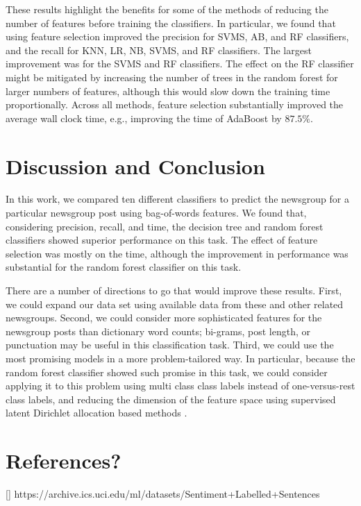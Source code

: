 \documentclass{article} %
\begin{document}
These results highlight the benefits for some of the methods of reducing the number of features before training the classifiers. In particular, we found that using feature selection improved the precision for SVMS, AB, and RF classifiers, and the recall for KNN, LR, NB, SVMS, and RF classifiers. The largest improvement was for the SVMS and RF classifiers. The effect on the RF classifier might be mitigated by increasing the number of trees in the random forest for larger numbers of features, although this would slow down the training time proportionally. Across all methods, feature selection substantially improved the average wall clock time, e.g., improving the time of AdaBoost by $87.5\%$.

\section{Discussion and Conclusion}

In this work, we compared ten different classifiers to predict the newsgroup for a particular newsgroup post using bag-of-words features. We found that, considering precision, recall, and time, the decision tree and random forest classifiers showed superior performance on this task.  The effect of feature selection was mostly on the time, although the improvement in performance was substantial for the random forest classifier on this task.

There are a number of directions to go that would improve these results. First, we could expand our data set using available data from these and other related newsgroups. Second, we could consider more sophisticated features for the newsgroup posts than dictionary word counts; bi-grams, post length, or punctuation may be useful in this classification task. Third, we could use the most promising models in a more problem-tailored way. In particular, because the random forest classifier showed such promise in this task, we could consider applying it to this problem using multi class class labels instead of one-versus-rest class labels, and reducing the dimension of the feature space using supervised latent Dirichlet allocation based methods \cite{zhu2009,lacoste2009}. 

\section{References?}

[] https://archive.ics.uci.edu/ml/datasets/Sentiment+Labelled+Sentences
\end{document}
